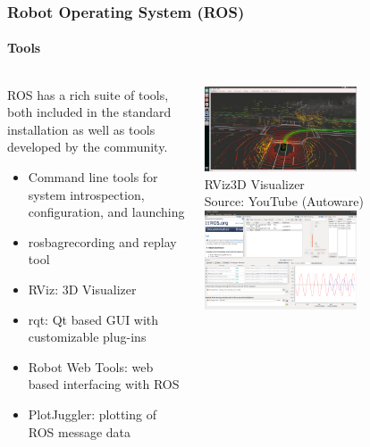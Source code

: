 \begin{frame}
\frametitle{Robot Operating System (ROS)}
\framesubtitle{Tools}
\begin{columns}[]
    \begin{column}{0.65\textwidth}
        \footnotesize
        ROS has a rich suite of tools, both included in the standard installation as
        well as tools developed by the community.\\
        \begin{itemize}
            \item Command line tools for system introspection, configuration,
                and launching
            \item rosbag\footnotemark[1] recording and replay tool
            \item RViz\footnotemark[2]: 3D Visualizer
            \item rqt\footnotemark[3]: Qt based GUI with customizable plug-ins
            \item Robot Web Tools\footnotemark[4]: web based interfacing with ROS
            \item PlotJuggler\footnotemark[5]: plotting of ROS message data 
        \end{itemize}
    \end{column}
    \begin{column}{0.35\textwidth}
        \centering
        \includegraphics[width=0.6\textwidth]{images/rviz.jpg}\\
        \scriptsize RViz\footnotemark[2] 3D Visualizer\\
        Source: YouTube (Autoware)\footnotemark[6]\\
        \vspace{0.25cm}
        \includegraphics[width=0.6\textwidth]{images/rqt.png}\\

\end{column}
\end{columns}
\end{frame}
